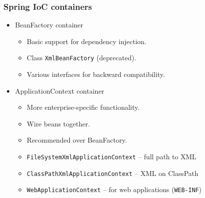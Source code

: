\documentclass[10pt,xcolor=pdflatex, table]{beamer}
\begin{document}
\begin{frame}[fragile]\frametitle{Spring IoC containers}
	\begin{itemize}
		\item BeanFactory container
          \begin{itemize}
        	\item Basic support for dependency injection.
            \item Class \texttt{XmlBeanFactory} (deprecated).
        	\item Various interfaces for backward compatibility.
          \end{itemize}
        \item ApplicationContext container
          \begin{itemize}
        	\item More enterprise-specific functionality.
        	\item Wire beans together.
        	\item Recommended over BeanFactory.
        	\item \texttt{FileSystemXmlApplicationContext} -- full path to XML
        	\item \texttt{ClassPathXmlApplicationContext} -- XML on ClassPath
        	\item \texttt{WebApplicationContext} -- for web applications (\texttt{WEB-INF})
          \end{itemize}
	\end{itemize}
\end{frame}
\end{document}
